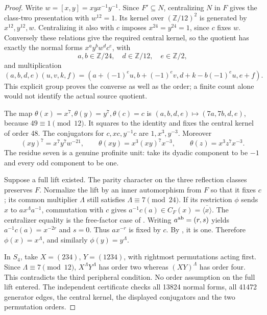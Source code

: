 \begin{proof}
Write \(w=[x,y]=xyx^{-1}y^{-1}\). Since \(F'\subseteq N\),
centralizing \(N\) in \(F\) gives the class-two presentation with
\(w^{12}=1\). Its kernel over \((\mathbb Z/12)^2\) is generated
by \(x^{12},y^{12},w\). Centralizing it also with \(c\) imposes
\(x^{24}=y^{24}=1\), since \(c\) fixes \(w\). Conversely these
relations give the required central kernel, so the quotient has exactly
the normal forms \(x^ay^bw^dc^e\), with
\[
 a,b\in\mathbb Z/24,\quad d\in\mathbb Z/12,\quad e\in\mathbb Z/2,
\]
and multiplication
\[
 (a,b,d,e)(u,v,k,f)=
 (a+(-1)^eu,b+(-1)^ev,d+k-b(-1)^eu,e+f).
\]
This explicit group proves the converse as well as the order; a finite
count alone would not identify the actual source quotient.

The map \(\theta(x)=x^7,\theta(y)=y^7,\theta(c)=c\) is
\((a,b,d,e)\mapsto(7a,7b,d,e)\), because \(49\equiv1\pmod{12}\).
It squares to the identity and fixes the central kernel of order 48.
The conjugators for \(c,xc,y^{-1}c\) are \(1,x^3,y^{-3}\).
Moreover
\[
 (xy)^7=x^7y^7w^{-21},\qquad
 \theta(xy)=x^3(xy)^7x^{-3},\qquad
 \theta(z)=x^3z^7x^{-3}.
\]
The residue seven is a genuine profinite unit: take its dyadic component
to be \(-1\) and every odd component to be one.

Suppose a full lift existed. The parity character on the three
reflection classes preserves \(F\). Normalize the lift by an inner
automorphism from \(F\) so that it fixes \(c\); its common multiplier
\(\Lambda\) still satisfies \(\Lambda\equiv7\pmod{24}\).
If its restriction \(\phi\) sends \(x\) to
\(ax^\Lambda a^{-1}\), commutation with \(c\) gives
\(a^{-1}c(a)\in C_F(x)=\overline{\langle x\rangle}\).
The centralizer equality is the free-factor case of
\citet[Theorem B', pp.~159--160]{SymHerfortRibes1985}.
Writing \(a^{\rm ab}=(r,s)\) yields
\(a^{-1}c(a)=x^{-2r}\) and \(s=0\). Thus \(ax^{-r}\) is
fixed by \(c\). By \citet[Proposition 4(i), p.~574; proof p.~581]{SymLochakSchneps1997},
it is one. Therefore \(\phi(x)=x^\Lambda\), and similarly
\(\phi(y)=y^\Lambda\).

In \(S_4\), take \(X=(234)\), \(Y=(1234)\), with rightmost
permutations acting first. Since \(\Lambda\equiv7\pmod{12}\),
\(X^\Lambda Y^\Lambda\) has order two whereas
\((XY)^\Lambda\) has order four. This contradicts the third
peripheral condition. No order assumption on the full lift entered.
The independent certificate 
checks all 13824 normal forms, all 41472 generator edges, the central
kernel, the displayed conjugators and the two permutation orders.
\end{proof}

